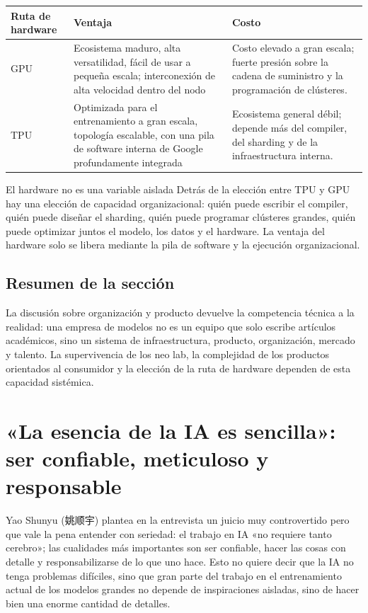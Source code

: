 \documentclass[a4paper]{article}
\begin{document}
\noindent\begin{tabularx}{\textwidth}{p{}p{}X}
\toprule
Ruta de hardware & Ventaja & Costo \\
\midrule
GPU & Ecosistema maduro, alta versatilidad, fácil de usar a pequeña escala; interconexión de alta velocidad dentro del nodo & Costo elevado a gran escala; fuerte presión sobre la cadena de suministro y la programación de clústeres. \\
TPU & Optimizada para el entrenamiento a gran escala, topología escalable, con una pila de software interna de Google profundamente integrada & Ecosistema general débil; depende más del compiler, del sharding y de la infraestructura interna. \\
\bottomrule
\end{tabularx}

\begin{importantbox}{El hardware no es una variable aislada}
Detrás de la elección entre TPU y GPU hay una elección de capacidad organizacional: quién puede escribir el compiler, quién puede diseñar el sharding, quién puede programar clústeres grandes, quién puede optimizar juntos el modelo, los datos y el hardware. La ventaja del hardware solo se libera mediante la pila de software y la ejecución organizacional.
\end{importantbox}

\subsection{Resumen de la sección}

La discusión sobre organización y producto devuelve la competencia técnica a la realidad: una empresa de modelos no es un equipo que solo escribe artículos académicos, sino un sistema de infraestructura, producto, organización, mercado y talento. La supervivencia de los neo lab, la complejidad de los productos orientados al consumidor y la elección de la ruta de hardware dependen de esta capacidad sistémica.
\section{«La esencia de la IA es sencilla»: ser confiable, meticuloso y responsable}

Yao Shunyu (姚顺宇) plantea en la entrevista un juicio muy controvertido pero que vale la pena entender con seriedad: el trabajo en IA «no requiere tanto cerebro»; las cualidades más importantes son ser confiable, hacer las cosas con detalle y responsabilizarse de lo que uno hace. Esto no quiere decir que la IA no tenga problemas difíciles, sino que gran parte del trabajo en el entrenamiento actual de los modelos grandes no depende de inspiraciones aisladas, sino de hacer bien una enorme cantidad de detalles.
\end{document}
